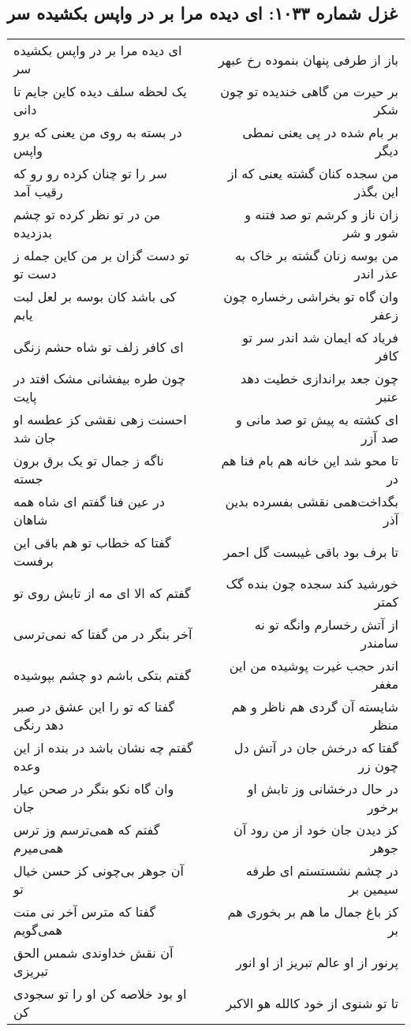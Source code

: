 \begin{center}
\section*{غزل شماره ۱۰۳۳: ای دیده مرا بر در واپس بکشیده سر}
\label{sec:1033}
\begin{longtable}{l p{0.5cm} r}
ای دیده مرا بر در واپس بکشیده سر
&&
باز از طرفی پنهان بنموده رخ عبهر
\\
یک لحظه سلف دیده کاین جایم تا دانی
&&
بر حیرت من گاهی خندیده تو چون شکر
\\
در بسته به روی من یعنی که برو واپس
&&
بر بام شده در پی یعنی نمطی دیگر
\\
سر را تو چنان کرده رو رو که رقیب آمد
&&
من سجده کنان گشته یعنی که از این بگذر
\\
من در تو نظر کرده تو چشم بدزدیده
&&
زان ناز و کرشم تو صد فتنه و شور و شر
\\
تو دست گزان بر من کاین جمله ز دست تو
&&
من بوسه زنان گشته بر خاک به عذر اندر
\\
کی باشد کان بوسه بر لعل لبت یابم
&&
وان گاه تو بخراشی رخساره چون زعفر
\\
ای کافر زلف تو شاه حشم زنگی
&&
فریاد که ایمان شد اندر سر تو کافر
\\
چون طره بیفشانی مشک افتد در پایت
&&
چون جعد براندازی خطیت دهد عنبر
\\
احسنت زهی نقشی کز عطسه او جان شد
&&
ای کشته به پیش تو صد مانی و صد آزر
\\
ناگه ز جمال تو یک برق برون جسته
&&
تا محو شد این خانه هم بام فنا هم در
\\
در عین فنا گفتم ای شاه همه شاهان
&&
بگداخت‌همی نقشی بفسرده بدین آذر
\\
گفتا که خطاب تو هم باقی این برفست
&&
تا برف بود باقی غیبست گل احمر
\\
گفتم که الا ای مه از تابش روی تو
&&
خورشید کند سجده چون بنده گک کمتر
\\
آخر بنگر در من گفتا که نمی‌ترسی
&&
از آتش رخسارم وانگه تو نه سامندر
\\
گفتم بتکی باشم دو چشم بپوشیده
&&
اندر حجب غیرت پوشیده من این مغفر
\\
گفتا که تو را این عشق در صبر دهد رنگی
&&
شایسته آن گردی هم ناظر و هم منظر
\\
گفتم چه نشان باشد در بنده از این وعده
&&
گفتا که درخش جان در آتش دل چون زر
\\
وان گاه نکو بنگر در صحن عیار جان
&&
در حال درخشانی وز تابش او برخور
\\
گفتم که همی‌ترسم وز ترس همی‌میرم
&&
کز دیدن جان خود از من رود آن جوهر
\\
آن جوهر بی‌چونی کز حسن خیال تو
&&
در چشم نشستستم ای طرفه سیمین بر
\\
گفتا که مترس آخر نی منت همی‌گویم
&&
کز باغ جمال ما هم بر بخوری هم بر
\\
آن نقش خداوندی شمس الحق تبریزی
&&
پرنور از او عالم تبریز از او انور
\\
او بود خلاصه کن او را تو سجودی کن
&&
تا تو شنوی از خود کالله هو الاکبر
\\
\end{longtable}
\end{center}
